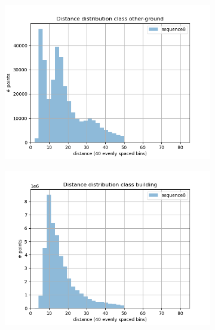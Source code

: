 \begin{figure}[h]
\begin{subfigure}[b]{0.24\textwidth}
         \includegraphics[width=\textwidth]{Figures/Chapter4/dist-height/dist/test/class12.png}
     \end{subfigure}
     \hfill
     \begin{subfigure}[b]{0.24\textwidth}
         \centering
         \includegraphics[width=\textwidth]{Figures/Chapter4/dist-height/dist/test/class13.png}
     \end{subfigure}
     \begin{subfigure}[b]{0.24\textwidth}
         \centering

\end{subfigure}
\end{figure}
